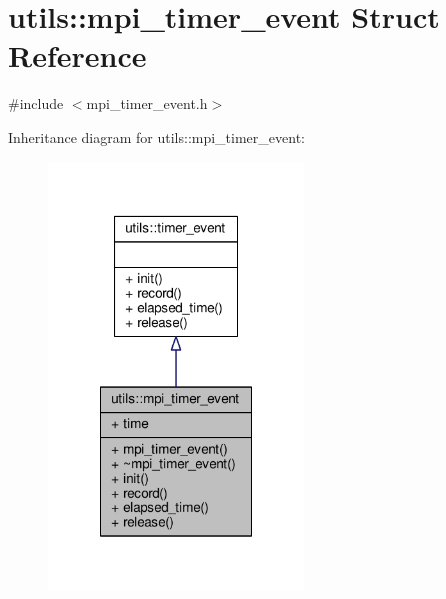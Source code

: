 \hypertarget{structutils_1_1mpi__timer__event}{\section{utils\-:\-:mpi\-\_\-timer\-\_\-event Struct Reference}
\label{structutils_1_1mpi__timer__event}
}


{\ttfamily \#include $<$mpi\-\_\-timer\-\_\-event.\-h$>$}



Inheritance diagram for utils\-:\-:mpi\-\_\-timer\-\_\-event\-:\nopagebreak
\begin{figure}[H]
\begin{center}
\leavevmode
\includegraphics[width=192pt]{structutils_1_1mpi__timer__event__inherit__graph}
\end{center}
\end{figure}


